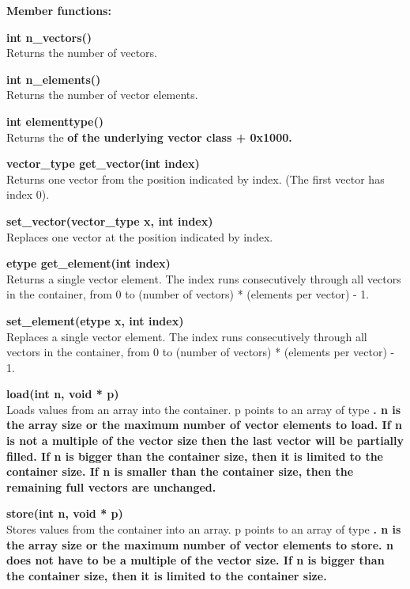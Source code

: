 \documentclass[11pt,a4paper,oneside,openright]{report}
\newcommand{\vspacebig}{\vspace{6mm}}
\newcommand{\codei}[1]{\bfseries \ttfamily{#1}\normalfont}
\begin{document}
{\bfseries Member functions:}\\
\vspacebig

{\bfseries int n\_vectors()}\\
Returns the number of vectors.
\vspacebig

{\bfseries int n\_elements()}\\
Returns the number of vector elements.
\vspacebig

{\bfseries int elementtype()}\\
Returns the \codei{elementtype()} of the underlying vector class + 0x1000.
\vspacebig

{\bfseries vector\_type get\_vector(int index)}\\
Returns one vector from the position indicated by index. (The first vector has index 0).
\vspacebig

{\bfseries set\_vector(vector\_type x, int index)}\\
Replaces one vector at the position indicated by index.
\vspacebig

{\bfseries etype get\_element(int index)}\\
Returns a single vector element. The index runs consecutively through all vectors in the container, from 0 to (number of vectors) * (elements per vector) - 1.
\vspacebig

{\bfseries set\_element(etype x, int index)}\\
Replaces a single vector element. The index runs consecutively through all vectors in the container, from 0 to (number of vectors) * (elements per vector) - 1.
\vspacebig

{\bfseries load(int n, void * p)}\\
Loads values from an array into the container. p points to an array of type 
\codei{etype}. n is the array size or the maximum number of vector elements to load. If n is not a multiple of the vector size then the last vector will be partially filled. If n is bigger than the container size, then it is limited to the container size. If n is smaller than the container size, then the remaining full vectors are unchanged.
\vspacebig

{\bfseries store(int n, void * p)}\\
Stores values from the container into an array. p points to an array of type 
\codei{etype}.
n is the array size or the maximum number of vector elements to store. n does not have to be a multiple of the vector size. If n is bigger than the container size, then it is limited to the container size.
\vspacebig
\end{document}
